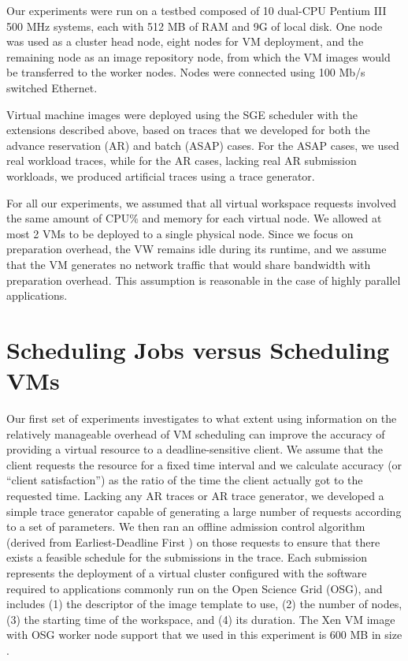 \documentclass[singlespace]{ccw_chithesis}
\begin{document}
Our experiments were run on a testbed composed of 10 dual{}-CPU Pentium
III 500 MHz systems, each with 512 MB of RAM and 9G of local disk. One
node was used as a cluster head node, eight nodes for VM deployment,
and the remaining node as an image repository node, from which the VM
images would be transferred to the worker nodes. Nodes were connected
using 100 Mb/s switched Ethernet.

Virtual machine images were deployed using the SGE scheduler with the
extensions described above, based on traces that we developed for both
the advance reservation (AR) and batch (ASAP) cases. For the ASAP
cases, we used real workload traces, while for the AR cases, lacking
real AR submission workloads, we produced artificial traces using a
trace generator.


For all our experiments, we assumed that all virtual workspace requests
involved the same amount of CPU\% and memory for each virtual node. We
allowed at most 2 VMs to be deployed to a single physical node. Since
we focus on preparation overhead, the VW remains idle during its
runtime, and we assume that the VM generates no network traffic that
would share bandwidth with preparation overhead. This assumption is
reasonable in the case of highly parallel applications.

\section{Scheduling Jobs versus Scheduling VMs}

Our first set of experiments investigates to what extent using
information on the relatively manageable overhead of VM scheduling can
improve the accuracy of providing a virtual resource to a
deadline{}-sensitive client. We assume that the client requests the
resource for a fixed time interval and we calculate accuracy (or
``client satisfaction'') as the ratio of the time the client actually
got to the requested time. Lacking any AR traces or AR trace generator,
we developed a simple trace generator capable of generating a large
number of requests according to a set of parameters. We then ran an
offline admission control algorithm (derived from Earliest{}-Deadline
First \cite{BorjaCite22}) on those requests to ensure that there exists a feasible
schedule for the submissions in the trace. Each submission represents
the deployment of a virtual cluster configured with the software
required to applications commonly run on the Open Science Grid (OSG),
and includes (1) the descriptor of the image template to use, (2) the
number of nodes, (3) the starting time of the workspace, and (4) its
duration. The Xen VM image with OSG worker node support that we used in
this experiment is 600 MB in size \cite{DBLP:conf/ccgrid/FosterFKSSZ06}.
\end{document}

